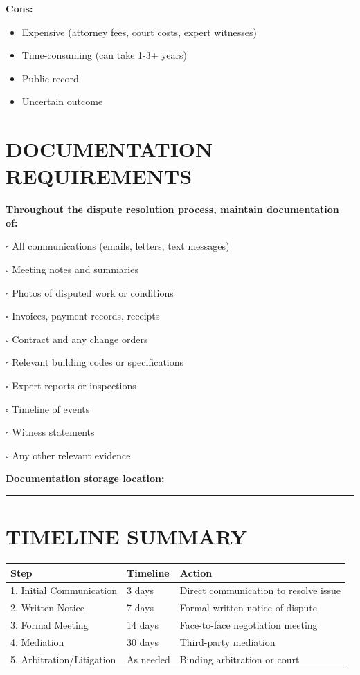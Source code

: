 \documentclass[11pt,letterpaper]{article}
\begin{document}
\textbf{Cons:}
\begin{itemize}[leftmargin=0.75in]
\item Expensive (attorney fees, court costs, expert witnesses)
\item Time-consuming (can take 1-3+ years)
\item Public record
\item Uncertain outcome
\end{itemize}

\vspace{12pt}

\section*{DOCUMENTATION REQUIREMENTS}

\textbf{Throughout the dispute resolution process, maintain documentation of:}

$\square$ All communications (emails, letters, text messages)

$\square$ Meeting notes and summaries

$\square$ Photos of disputed work or conditions

$\square$ Invoices, payment records, receipts

$\square$ Contract and any change orders

$\square$ Relevant building codes or specifications

$\square$ Expert reports or inspections

$\square$ Timeline of events

$\square$ Witness statements

$\square$ Any other relevant evidence

\vspace{6pt}

\textbf{Documentation storage location:} \rule{8cm}{0.4pt}

\vspace{12pt}

\section*{TIMELINE SUMMARY}

\begin{tabular}{|p{1.5in}|p{1in}|p{3.5in}|}
\hline
\textbf{Step} & \textbf{Timeline} & \textbf{Action} \\
\hline
1. Initial Communication & 3 days & Direct communication to resolve issue \\
\hline
2. Written Notice & 7 days & Formal written notice of dispute \\
\hline
3. Formal Meeting & 14 days & Face-to-face negotiation meeting \\
\hline
4. Mediation & 30 days & Third-party mediation \\
\hline
5. Arbitration/Litigation & As needed & Binding arbitration or court \\
\hline
\end{tabular}
\end{document}
